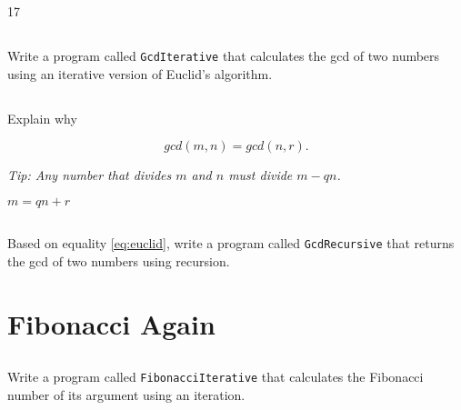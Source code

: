 \documentclass[a4paper, 11pt]{article}
\begin{document}
\begin{solution}
17
\end{solution}

\subsection{}

Write a program called \texttt{GcdIterative} that calculates the gcd of two
numbers using an iterative version of Euclid's algorithm.


\subsection{}

Explain why

\begin{equation}
  \label{eq:euclid}
  gcd(m, n) = gcd(n, r)\text{.}
\end{equation}

\textsl{Tip: Any number that divides $m$ and $n$ must divide $m - qn$.}

\begin{solution}
  $m = qn + r$
\end{solution}

\subsection{}

Based on equality \eqref{eq:euclid}, write a program called
\texttt{GcdRecursive} that returns the gcd of two numbers using recursion.



\section{Fibonacci Again}

\subsection{}

Write a program called \texttt{FibonacciIterative} that calculates the Fibonacci number of its argument using an iteration.

\end{document}
